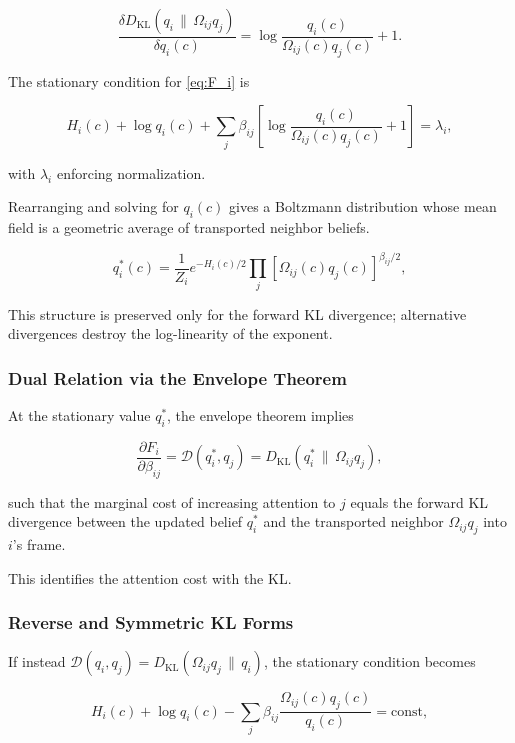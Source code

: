 \documentclass[11pt]{article}
\begin{document}
\[
\frac{\delta D_{\mathrm{KL}}(q_i \,\|\, \Omega_{ij} q_j)}{\delta q_i(c)} 
= \log\frac{q_i(c)}{\Omega_{ij}(c) q_j(c)} + 1.
\]

The stationary condition for \eqref{eq:F_i} is

\begin{equation}
H_i(c)
+ \log q_i(c)
+ \sum_j \beta_{ij}
\!\left[
\log\frac{q_i(c)}{\Omega_{ij}(c)q_j(c)}+1
\right]
= \lambda_i,
\end{equation}

with $\lambda_i$ enforcing normalization.

Rearranging and solving for $q_i(c)$ gives a Boltzmann distribution whose mean field is a geometric average of transported neighbor beliefs.

\begin{equation}
q_i^*(c)
= \frac{1}{Z_i}
e^{-H_i(c)/2}
\prod_j
[\Omega_{ij}(c) q_j(c)]^{\beta_{ij}/2},
\label{eq:q_i_star}
\end{equation}

This structure is preserved only for the forward KL divergence; alternative divergences destroy the log-linearity of the exponent.

\subsubsection{Dual Relation via the Envelope Theorem}
At the stationary value $q_i^*$, the envelope theorem implies

\begin{equation}
\frac{\partial F_i}{\partial \beta_{ij}}
= \mathcal{D}(q_i^*, q_j)
= D_{\mathrm{KL}}(q_i^* \,\|\, \Omega_{ij} q_j),
\label{eq:envelope}
\end{equation}

such that the marginal cost of increasing attention to $j$ equals the forward KL divergence between the updated belief $q_i^*$ and the transported neighbor $\Omega_{ij} q_j$ into $i$'s frame.

This identifies the attention cost with the KL.

\subsubsection{Reverse and Symmetric KL Forms}
If instead $\mathcal{D}(q_i,q_j) = D_{\mathrm{KL}}(\Omega_{ij}q_j \,\|\, q_i)$, the stationary condition becomes

\begin{equation}
H_i(c)
+ \log q_i(c)
- \sum_j \beta_{ij}
\frac{\Omega_{ij}(c) q_j(c)}{q_i(c)}
= \text{const},
\end{equation}
\end{document}
